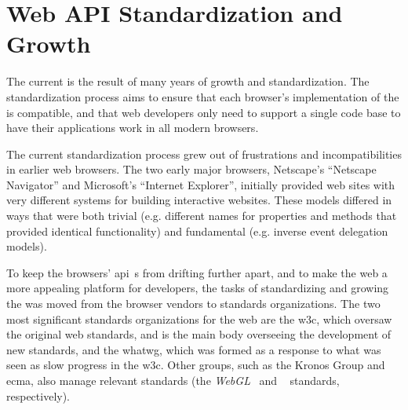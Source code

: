\section{Web API Standardization and Growth}
\label{background:webapi-growth}

The current \WAPI is the result of many years of growth and standardization.
The standardization process aims to
ensure that each browser's implementation  of the \WAPI is compatible, and that
web developers only need to support a single code base to have their applications
work in all modern browsers.

The current standardization process grew out of frustrations and incompatibilities
in earlier web browsers.  The two early major browsers, Netscape's ``Netscape
Navigator'' and Microsoft's ``Internet Explorer'', initially provided web sites
with very different systems for building interactive websites.  These
models differed in ways that were both trivial
(e.g. different names for properties and methods that provided identical
functionality) and fundamental (e.g. inverse event delegation models).

To keep the browsers' \gls{api}~s from drifting further apart, and
to make the web a more appealing platform for developers,
the tasks of standardizing and growing the \WAPI was moved from the browser
vendors to standards organizations.  The two most significant standards
organizations for the web are the \gls{w3c}, which oversaw the original web
standards, and is the main body overseeing the development of new \WAPI
standards, and the \gls{whatwg}, which was formed as a response to what was seen
as slow progress in the \gls{w3c}.  Other groups, such as the Kronos Group and
\gls{ecma}, also manage relevant standards (the
\textit{WebGL}~\cite{webgl2015standard} and \textit{\JS}~\cite{ecmascript}
standards, respectively).
